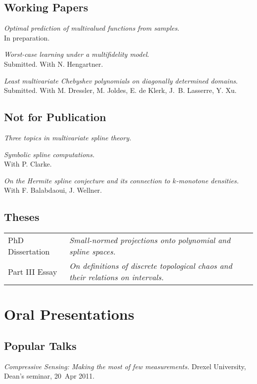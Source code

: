 \documentclass[11pt]{article}
\begin{document}
\subsection{Working Papers}
\betaremune
\item {\sl Optimal prediction of multivalued functions from samples}.\\
In preparation.
\item {\sl Worst-case learning under a multifidelity model}.\\
Submitted. With N. Hengartner.
\item {\sl Least multivariate Chebyshev polynomials on diagonally determined domains}.\\
Submitted. With M.  Dressler, M.  Joldes, E. de Klerk, J.~B. Lasserre,  Y. Xu.
\eetaremune

\subsection{Not for Publication}
\betaremune
\item {\sl Three topics in multivariate spline theory.}
\item {\sl Symbolic spline computations.}\\
 With P. Clarke.
\item {\sl On the Hermite spline conjecture and its connection to $k$-monotone densities.}\\
With F. Balabdaoui, J. Wellner.
\eetaremune

\subsection{Theses}
\begin{tabular}{ll}
PhD Dissertation & {\sl Small-normed projections onto polynomial and spline spaces.}\\
Part III Essay & {\sl On definitions of discrete topological chaos and their relations on intervals.}
\end{tabular}


\section{Oral Presentations}

\subsection{Popular Talks}
\betaremune
\item {\sl Compressive Sensing: Making the most of few measurements.}
Drexel University, Dean's seminar, 20~Apr 2011.
\eetaremune
\end{document}
